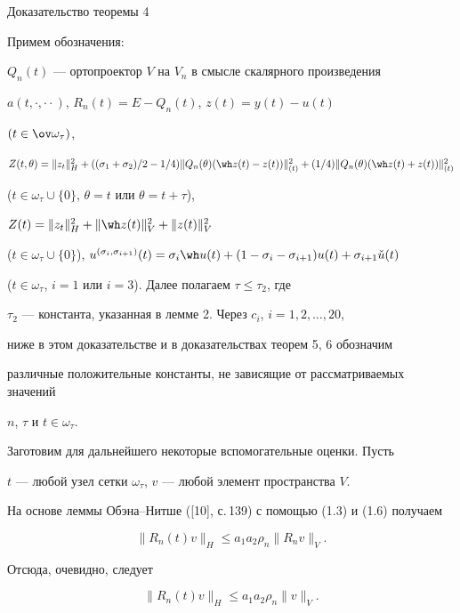 \begin{pf*}{Доказательство теоремы 4}


Примем обозначения:


$Q_n(t)$ --- ортопроектор $V$ на $V_n$ в смысле скалярного произведения


$a(t,\cdot,\cdot\cdot)$, $R_n(t)=E-Q_n(t)$, $z(t)=y(t)-u(t)$


$(t\in\ov\omega_\tau)$,


$Z(t,\theta)=\|z_t\|_H^2+((\sigma_1+\sigma_2)/2-1/4)


\|Q_n(\theta)(\wh z(t)-z(t))\|_{(t)}^2+(1/4)


\|Q_n(\theta)(\wh z(t)+z(t))\|_{(t)}^2$


($t\in\omega_\tau\cup\{0\}$, $\theta=t$ или $\theta=t+\tau$),


$Z(t)=\|z_t\|_H^2+\|\wh z(t)\|_V^2+\|z(t)\|_V^2$


($t\in\omega_\tau\cup\{0\}$), $u^{(\sigma_i,\sigma_{i+1})}(t)=\sigma_i\wh u(t)


+(1-\sigma_i-\sigma_{i+1})u(t)+\sigma_{i+1}\check u(t)$


($t\in\omega_\tau$, $i=1$ или $i=3$). Далее полагаем $\tau\le\tau_2$, где


$\tau_2$ --- константа, указанная  в лемме 2. Через $c_i$, $i=1,2,\dotsc,20$,


ниже в этом доказательстве и в доказательствах теорем 5, 6 обозначим


различные положительные константы, не зависящие от рассматриваемых значений


$n$, $\tau$ и $t\in\omega_\tau$.





Заготовим для дальнейшего некоторые вспомогательные оценки. Пусть


$t$ --- любой узел сетки $\omega_\tau$, $v$ --- любой элемент пространства $V$.


На основе леммы Обэна--Нитше ([10], с.\,139) с помощью (1.3) и (1.6) получаем


\begin{equation}


\|R_n(t)v\|_H\le a_1a_2\rho_n\|R_nv\|_V.


\end{equation}


Отсюда, очевидно, следует


\begin{equation}


\|R_n(t)v\|_H\le a_1a_2\rho_n\|v\|_V.



\end{equation}
\end{pf*}
